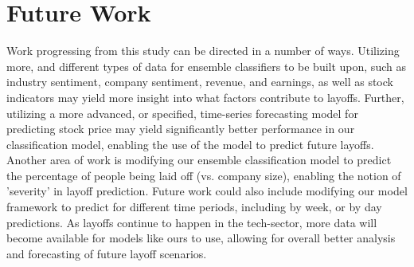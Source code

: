 \documentclass[10pt]{article}
\begin{document}
%
% 
\section{Future Work}
Work progressing from this study can be directed in a number of ways. 
Utilizing more, and different types of data for ensemble classifiers 
to be built upon, such as industry sentiment, company sentiment, 
revenue, and earnings, as well as stock indicators may yield more 
insight into what factors contribute to layoffs. Further, utilizing 
a more advanced, or specified, time-series forecasting model for 
predicting stock price may yield significantly better performance in 
our classification model, enabling the use of the model to predict 
future layoffs. Another area of work is modifying our ensemble 
classification model to predict the percentage of people being laid 
off (vs. company size), enabling the notion of 'severity' in layoff 
prediction. Future work could also include modifying our model 
framework to predict for different time periods, including by week,
or by day predictions. As layoffs continue to happen in the 
tech-sector, more data will become available for models like ours to 
use, allowing for overall better analysis and forecasting of future 
layoff scenarios.


\end{document}

